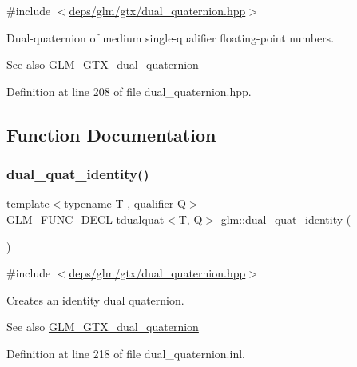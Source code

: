 {\ttfamily \#include $<$\hyperlink{dual__quaternion_8hpp}{deps/glm/gtx/dual\+\_\+quaternion.\+hpp}$>$}

Dual-\/quaternion of medium single-\/qualifier floating-\/point numbers.

\begin{DoxySeeAlso}{See also}
\hyperlink{group__gtx__dual__quaternion}{G\+L\+M\+\_\+\+G\+T\+X\+\_\+dual\+\_\+quaternion} 
\end{DoxySeeAlso}


Definition at line 208 of file dual\+\_\+quaternion.\+hpp.



\subsection{Function Documentation}
\mbox{\label{group__gtx__dual__quaternion_ga0b35c0e30df8a875dbaa751e0bd800e0}} 
\subsubsection{\texorpdfstring{dual\+\_\+quat\+\_\+identity()}{dual\_quat\_identity()}}
{\footnotesize\ttfamily template$<$typename T , qualifier Q$>$ \\
G\+L\+M\+\_\+\+F\+U\+N\+C\+\_\+\+D\+E\+CL \hyperlink{structglm_1_1tdualquat}{tdualquat}$<$T, Q$>$ glm\+::dual\+\_\+quat\+\_\+identity (\begin{DoxyParamCaption}{ }\end{DoxyParamCaption})}



{\ttfamily \#include $<$\hyperlink{dual__quaternion_8hpp}{deps/glm/gtx/dual\+\_\+quaternion.\+hpp}$>$}

Creates an identity dual quaternion.

\begin{DoxySeeAlso}{See also}
\hyperlink{group__gtx__dual__quaternion}{G\+L\+M\+\_\+\+G\+T\+X\+\_\+dual\+\_\+quaternion} 
\end{DoxySeeAlso}


Definition at line 218 of file dual\+\_\+quaternion.\+inl.

